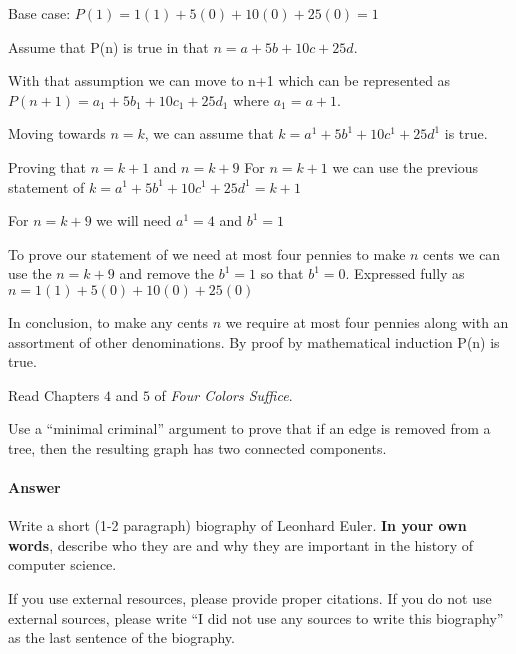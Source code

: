 \documentclass{article}
\begin{document}
Base case: $P(1) = 1(1)+5(0)+10(0)+25(0) = 1$

Assume that P(n) is true in that $n = a+5b+10c+25d$.

With that assumption we can move to n+1 which can be represented as
$P(n+1) = a_1+5b_1+10c_1+25d_1$ where $a_1=a+1$.

Moving towards $n=k$, we can assume that $k = a^1+5b^1+10c^1+25d^1$ is true.

Proving that $n = k+1$ and $n =k+9$
For $n = k+1$ we can use the previous statement of $k = a^1+5b^1+10c^1+25d^1 = k+1$

For $n = k+9$ we will need $a^1=4$ and $b^1=1$

To prove our statement of we need at most four pennies to make $n$ cents we can
use the $n = k+9$ and remove the $b^1=1$ so that $b^1=0$. Expressed fully as
$n = 1(1)+5(0)+10(0)+25(0)$

In conclusion, to make any cents $n$ we require at most four pennies along with
an assortment of other denominations.
By proof by mathematical induction P(n) is true.


\collab{\todo{}} 

Read Chapters $4$ and $5$ of \emph{Four Colors Suffice}.

Use a ``minimal criminal'' argument to prove that if an edge is removed from a
tree, then the resulting graph has two connected components.

        \paragraph{Answer}



Write a short (1-2 paragraph) biography of Leonhard Euler.
\textbf{In your own words}, describe who they are and why they are important in
the history of computer science.

If you use external resources, please provide
proper citations. If you do not use external sources, please write ``I did not
use any sources to write this biography'' as the last sentence of the
biography.
\end{document}
